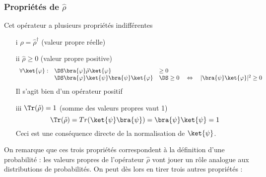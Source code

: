 \subsubsection{Propriétés de $\hat{\rho}$}
Cet opérateur a plusieurs propriétés indifférentes
\begin{enumerate}
\item[i] $\hat{\rho} = \hat{\rho}^\dagger$  (valeur propre réelle)
\item[ii] $\hat{\rho} \geq 0$ (valeur propre positive)
\begin{equation}
\begin{array}{lll}
\forall\ket{\varphi} :&\DS \bra{\varphi}\hat{\rho}\ket{\varphi} &\geq 0\\
&\DS \bra{\varphi}\ket{\psi}\bra{\psi}\ket{\varphi} &\DS\geq 0\quad \Leftrightarrow\quad |\bra{\psi}\ket{\varphi}|^2 \geq 0
\end{array}
\end{equation}
Il s'agit bien d'un opérateur positif
\item[iii] $\Tr(\hat{\rho}) = 1$ (somme des valeurs propres vaut 1)
\begin{equation}
\Tr(\hat{\rho})=Tr(\ket{\psi}\bra{\psi}) = \bra{\psi}\ket{\psi} = 1
\end{equation}
Ceci est une conséquence directe de la normalisation de $\ket{\psi}$.
\end{enumerate}
On remarque que ces trois propriétés correspondent à la définition d'une probabilité : les valeurs propres
de l'opérateur $\hat{\rho}$ vont jouer un rôle analogue aux distributions de probabilités. On peut dès lors 
en tirer trois autres propriétés :
